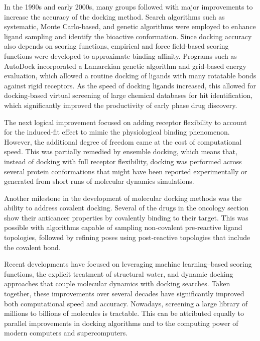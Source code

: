 \documentclass[12pt]{article}
\begin{document}
In the 1990s and early 2000s, many groups followed with major improvements to increase the accuracy of the docking method. Search algorithms such as systematic, Monte Carlo-based, and genetic algorithms were employed to enhance ligand sampling and identify the bioactive conformation. Since docking accuracy also depends on scoring functions, empirical and force field-based scoring functions were developed to approximate binding affinity.\cite{CH1_7, CH1_8} Programs such as AutoDock incorporated a Lamarckian genetic algorithm and grid‑based energy evaluation, which allowed a routine docking of ligands with many rotatable bonds against rigid receptors.\cite{CH1_9} As the speed of docking ligands increased, this allowed for docking-based virtual screening of large chemical databases for hit identification, which significantly improved the productivity of early phase drug discovery. 



The next logical improvement focused on adding receptor flexibility to account for the induced-fit effect to mimic the physiological binding phenomenon. However, the additional degree of freedom came at the cost of computational speed\cite{CH1_8}. This was partially remedied by ensemble docking, which means that, instead of docking with full receptor flexibility, docking was performed across several protein conformations that might have been reported experimentally or generated from short runs of molecular dynamics simulations. 

Another milestone in the development of molecular docking methods was the ability to address covalent docking. Several of the drugs in the oncology section show their anticancer properties by covalently binding to their target. This was possible with algorithms capable of sampling non-covalent pre-reactive ligand topologies, followed by refining poses using post-reactive topologies that include the covalent bond\cite{CH1_11,CH1_12}.



Recent developments have focused on leveraging machine learning–based scoring functions, the explicit treatment of structural water, and dynamic docking approaches that couple molecular dynamics with docking searches\cite{CH1_10}. Taken together, these improvements over several decades have significantly improved both computational speed and accuracy. Nowadays, screening a large library of millions to billions of molecules is tractable. This can be attributed equally to parallel improvements in docking algorithms and to the computing power of modern computers and supercomputers.
\end{document}
